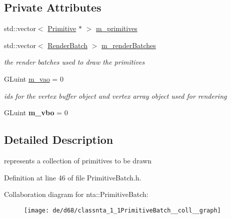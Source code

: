 \subsection*{Private Attributes}
\begin{DoxyCompactItemize}
\item 
std\+::vector$<$ \hyperlink{structnta_1_1Primitive}{Primitive} $\ast$ $>$ \hyperlink{classnta_1_1PrimitiveBatch_a85b1ab0111c7d02d5899f47fe1946c4f}{m\+\_\+primitives}
\item 
\mbox{\label{classnta_1_1PrimitiveBatch_a3abb09d0693913206ed7e580827d6fd7}} 
std\+::vector$<$ \hyperlink{structnta_1_1RenderBatch}{Render\+Batch} $>$ \hyperlink{classnta_1_1PrimitiveBatch_a3abb09d0693913206ed7e580827d6fd7}{m\+\_\+render\+Batches}
\begin{DoxyCompactList}\small\item\em the render batches used to draw the primitives \end{DoxyCompactList}\item 
\mbox{\label{classnta_1_1PrimitiveBatch_aa2d837d036dd9f57145870546f7514e6}} 
G\+Luint \hyperlink{classnta_1_1PrimitiveBatch_aa2d837d036dd9f57145870546f7514e6}{m\+\_\+vao} = 0
\begin{DoxyCompactList}\small\item\em ids for the vertex buffer object and vertex array object used for rendering \end{DoxyCompactList}\item 
\mbox{\label{classnta_1_1PrimitiveBatch_a2ba3a776569269877d67e8754ca68db2}} 
G\+Luint {\bfseries m\+\_\+vbo} = 0
\end{DoxyCompactItemize}


\subsection{Detailed Description}
represents a collection of primitives to be drawn 

Definition at line 46 of file Primitive\+Batch.\+h.



Collaboration diagram for nta\+:\+:Primitive\+Batch\+:\nopagebreak
\begin{figure}[H]
\begin{center}
\leavevmode
\texttt{[image: de/d68/classnta\_1\_1PrimitiveBatch\_\_coll\_\_graph]}
\end{center}
\end{figure}


